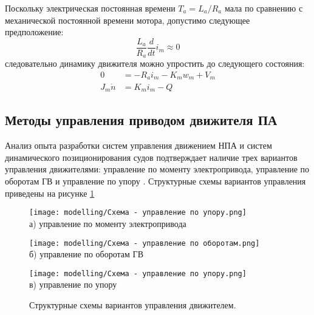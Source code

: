 Поскольку электрическая постоянная времени $T_a=L_a/R_a$ \cite{10.1109/48.838987} мала по сравнению с механической постоянной времени мотора, допустимо следующее предположение:
\begin{equation*}
    \frac{L_a}{R_a}\frac{d}{dt}i_m \approx 0
\end{equation*}
\noindent следовательно динамику движителя можно упростить до следующего состояния:
\begin{equation}
    \label{eq:motor_dynamics}
    \begin{array}{rl}
        0 &= -R_a i_m-K_m w_m + V_m \\
        J_m\dot{n} &= K_m i_m - Q
    \end{array}
\end{equation}

\subsection{Методы управления приводом движителя ПА}
Анализ опыта разработки систем управления движением НПА и систем динамического позиционирования судов подтверждает наличие трех вариантов управления движителями: управление по моменту электропривода, управление по оборотам ГВ и управление по упору \cite{костенко2020исследование, костенко2019разработка, sorensen20003}.
Структурные схемы вариантов управления приведены на рисунке \ref{fig:control_methods_schemes}

\begin{figure}[ht]
    \begin{minipage}[b][][b]{\linewidth}\centering
        \texttt{[image: modelling/Схема - управление по упору.png]} \\ а) управление по моменту электропривода
    \end{minipage}
    \hfill
    \begin{minipage}[b][][b]{\linewidth}\centering
        \texttt{[image: modelling/Схема - управление по оборотам.png]} \\ б) управление по оборотам ГВ
    \end{minipage}
    \begin{minipage}[b][][b]{\linewidth}\centering
        \texttt{[image: modelling/Схема - управление по упору.png]} \\ в) управление по упору
    \end{minipage}
    \caption{Структурные схемы вариантов управления движителем.}
    \label{fig:control_methods_schemes}
\end{figure}

